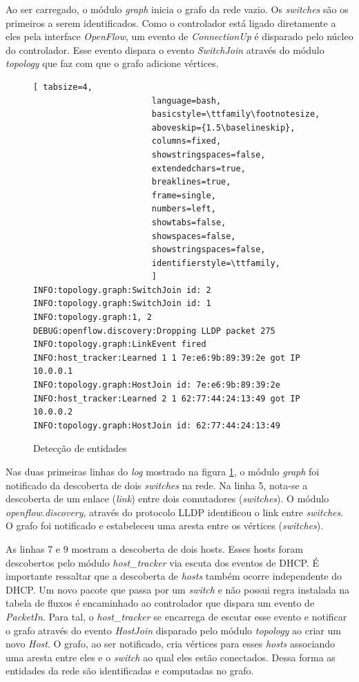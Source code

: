 Ao ser carregado, o módulo \emph{graph} inicia o grafo da rede vazio.
Os \emph{switches} são os primeiros a serem identificados. 
Como o controlador está ligado diretamente a eles pela interface
\emph{OpenFlow}, um evento de \emph{ConnectionUp} é disparado 
pelo núcleo do controlador.
Esse evento dispara o evento \emph{SwitchJoin} através do módulo 
\emph{topology} que faz com que o grafo adicione vértices.

\begin{figure}[h!]
    \centering
    \begin{lstlisting}[ tabsize=4,  
                        language=bash,
                        basicstyle=\ttfamily\footnotesize,
                        aboveskip={1.5\baselineskip},
                        columns=fixed,
                        showstringspaces=false,
                        extendedchars=true,
                        breaklines=true,
                        frame=single,
                        numbers=left,
                        showtabs=false,
                        showspaces=false,
                        showstringspaces=false,
                        identifierstyle=\ttfamily,
                        ]
INFO:topology.graph:SwitchJoin id: 2
INFO:topology.graph:SwitchJoin id: 1
INFO:topology.graph:1, 2
DEBUG:openflow.discovery:Dropping LLDP packet 275
INFO:topology.graph:LinkEvent fired
INFO:host_tracker:Learned 1 1 7e:e6:9b:89:39:2e got IP 10.0.0.1
INFO:topology.graph:HostJoin id: 7e:e6:9b:89:39:2e
INFO:host_tracker:Learned 2 1 62:77:44:24:13:49 got IP 10.0.0.2
INFO:topology.graph:HostJoin id: 62:77:44:24:13:49
        \end{lstlisting}
    \caption{Detecção de entidades}
    \label{fig:detection}
\end{figure}

Nas duas primeiras linhas do \emph{log} mostrado na figura
\ref{fig:detection}, o módulo \emph{graph} foi notificado
da descoberta de dois \emph{switches} na rede.
Na linha 5, nota-se a descoberta de um enlace (\emph{link}) entre dois
comutadores (\emph{switches}).
O módulo \emph{openflow.discovery}, através do protocolo LLDP identificou 
o link entre \emph{switches}.
O grafo foi notificado e estabeleceu uma aresta entre os 
vértices (\emph{switches}).

As linhas 7 e 9 mostram a descoberta de dois hosts.
Esses hosts foram descobertos pelo módulo \emph{host\_tracker} via 
escuta dos eventos de DHCP.
É importante ressaltar que a descoberta de \emph{hosts} também ocorre 
independente do DHCP.
Um novo pacote que passa por um \emph{switch} e não possui regra
instalada na tabela de fluxos é encaminhado ao controlador que 
dispara um evento de \emph{PacketIn}. 
Para tal, o \emph{host\_tracker} se encarrega de escutar esse evento 
e notificar o grafo através do evento \emph{HostJoin} disparado pelo módulo
\emph{topology} ao criar um novo \emph{Host}.
O grafo, ao ser notificado, cria vértices para esses \emph{hosts} associando 
uma aresta entre eles e o \emph{switch} ao qual eles estão conectados.
Dessa forma as entidades da rede são identificadas e computadas no grafo.



